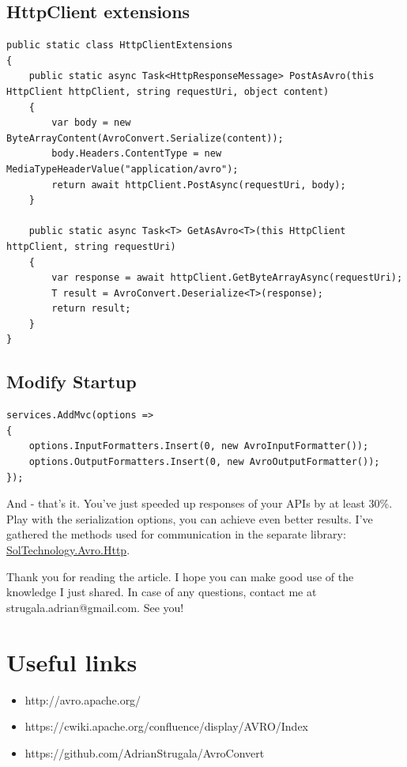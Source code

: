 \documentclass[]{article}
\begin{document}
\subsection{HttpClient extensions}

\begin{lstlisting}[language={[Sharp]C}, label={Script}]
public static class HttpClientExtensions
{
	public static async Task<HttpResponseMessage> PostAsAvro(this HttpClient httpClient, string requestUri, object content)
	{
		var body = new ByteArrayContent(AvroConvert.Serialize(content));
		body.Headers.ContentType = new MediaTypeHeaderValue("application/avro");
		return await httpClient.PostAsync(requestUri, body);
	}
	
	public static async Task<T> GetAsAvro<T>(this HttpClient httpClient, string requestUri)
	{
		var response = await httpClient.GetByteArrayAsync(requestUri);
		T result = AvroConvert.Deserialize<T>(response);
		return result;
	}
}
\end{lstlisting}


\subsection{Modify Startup}
\begin{lstlisting}[language={[Sharp]C}, label={Script}]
services.AddMvc(options =>
{
	options.InputFormatters.Insert(0, new AvroInputFormatter());
	options.OutputFormatters.Insert(0, new AvroOutputFormatter());
});
\end{lstlisting}

And - that's it. You've just speeded up responses of your APIs by at least 30\%. Play with the serialization options, you can achieve even better results. I've gathered the methods used for communication in the separate library: \href{https://www.nuget.org/packages/SolTechnology.Avro.Http}{SolTechnology.Avro.Http}.

Thank you for reading the article. I hope you can make good use of the knowledge I just shared. In case of any questions, contact me at strugala.adrian@gmail.com. See you!

\section{Useful links}
\begin{itemize}
	\item http://avro.apache.org/
	\item https://cwiki.apache.org/confluence/display/AVRO/Index
	\item https://github.com/AdrianStrugala/AvroConvert
\end{itemize}
\end{document}
